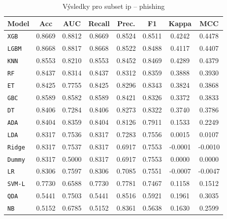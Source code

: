 \begin{table}[H]
  \centering
  \small
  \caption{Výsledky pro subset ip – phishing}
  \begin{tabular}{|l|c|c|c|c|c|c|c|}
    \hline
    \textbf{Model} & \textbf{Acc} & \textbf{AUC} & \textbf{Recall} & \textbf{Prec.} & \textbf{F1} & \textbf{Kappa} & \textbf{MCC} \\
    \hline
    \texttt{XGB} & 0.8669 & 0.8812 & 0.8669 & 0.8524 & 0.8511 & 0.4242 & 0.4478 \\
    \texttt{LGBM} & 0.8668 & 0.8817 & 0.8668 & 0.8522 & 0.8488 & 0.4117 & 0.4407 \\
    \texttt{KNN} & 0.8553 & 0.8210 & 0.8553 & 0.8452 & 0.8469 & 0.4289 & 0.4379 \\
    \texttt{RF} & 0.8437 & 0.8314 & 0.8437 & 0.8312 & 0.8359 & 0.3888 & 0.3930 \\
    \texttt{ET} & 0.8425 & 0.7755 & 0.8425 & 0.8296 & 0.8343 & 0.3824 & 0.3868 \\
    \texttt{GBC} & 0.8589 & 0.8582 & 0.8589 & 0.8421 & 0.8326 & 0.3372 & 0.3833 \\
    \texttt{DT} & 0.8406 & 0.7284 & 0.8406 & 0.8273 & 0.8322 & 0.3740 & 0.3786 \\
    \texttt{ADA} & 0.8404 & 0.8359 & 0.8404 & 0.8126 & 0.7911 & 0.1533 & 0.2249 \\
    \texttt{LDA} & 0.8317 & 0.7536 & 0.8317 & 0.7283 & 0.7556 & 0.0015 & 0.0107 \\
    \texttt{Ridge} & 0.8317 & 0.7537 & 0.8317 & 0.6917 & 0.7553 & -0.0001 & -0.0010 \\
    \texttt{Dummy} & 0.8317 & 0.5000 & 0.8317 & 0.6917 & 0.7553 & 0.0000 & 0.0000 \\
    \texttt{LR} & 0.8306 & 0.7597 & 0.8306 & 0.7085 & 0.7551 & -0.0007 & -0.0047 \\
    \texttt{SVM-L} & 0.7730 & 0.6588 & 0.7730 & 0.7781 & 0.7467 & 0.1158 & 0.1512 \\
    \texttt{QDA} & 0.5441 & 0.7503 & 0.5441 & 0.8516 & 0.5921 & 0.1961 & 0.3035 \\
    \texttt{NB} & 0.5152 & 0.6785 & 0.5152 & 0.8361 & 0.5638 & 0.1630 & 0.2599 \\
    \hline
  \end{tabular}
\end{table}
\vspace{0.5cm}

